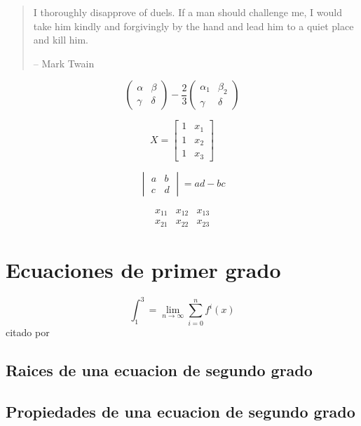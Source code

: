 \documentclass[10pt,]{krantz}
\theoremstyle{definition}
\theoremstyle{definition}
\theoremstyle{definition}
\theoremstyle{remark}
\begin{document}
\begin{quote}
I thoroughly disapprove of duels. If a man should challenge me,
I would take him kindly and forgivingly by the hand and lead him
to a quiet place and kill him.

-- Mark Twain
\end{quote}

\[\begin{pmatrix}\alpha & \beta\\
\gamma & \delta
\end{pmatrix}-\frac{2}{3} \begin{pmatrix}\alpha_1 & \beta_2\\
\gamma & \delta
\end{pmatrix}\]

\[X = \begin{bmatrix}1 & x_{1}\\
1 & x_{2}\\
1 & x_{3}
\end{bmatrix}\]

\[\begin{vmatrix}a & b\\
c & d
\end{vmatrix}=ad-bc\]

\[\begin{array}{ccc}
x_{11} & x_{12} & x_{13}\\
x_{21} & x_{22} & x_{23}
\end{array}\]

\hypertarget{appendix-apendice}{%
\appendix {}}


\hypertarget{ecuaciones-de-primer-grado}{%
\chapter{Ecuaciones de primer grado}\label{ecuaciones-de-primer-grado}}

\[\int_1^3=\lim_{n\to \infty}\sum_{i=0}^{n}f^i(x)\]
citado por \citep{xie2015}

\hypertarget{raices-de-una-ecuacion-de-segundo-grado}{%
\section{Raices de una ecuacion de segundo grado}\label{raices-de-una-ecuacion-de-segundo-grado}}

\hypertarget{propiedades-de-una-ecuacion-de-segundo-grado}{%
\section{Propiedades de una ecuacion de segundo grado}\label{propiedades-de-una-ecuacion-de-segundo-grado}}
\end{document}

